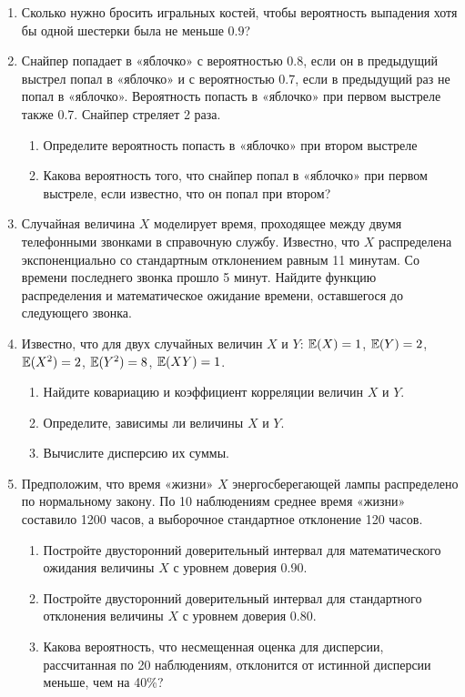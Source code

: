 \begin{enumerate}

\item Сколько нужно бросить игральных костей, чтобы вероятность выпадения хотя бы одной шестерки была не меньше $0.9$?
\item Снайпер попадает в «яблочко» с вероятностью 0.8, если он в предыдущий выстрел попал в «яблочко» и с вероятностью 0.7, если в предыдущий раз не попал в  «яблочко». Вероятность попасть в «яблочко» при первом выстреле также 0.7. Снайпер стреляет 2 раза.
\begin{enumerate}
\item Определите вероятность попасть в «яблочко» при втором выстреле
\item Какова вероятность того, что снайпер попал в «яблочко» при первом выстреле, если известно, что он попал при втором?
\end{enumerate}

\item Случайная величина $X$ моделирует время, проходящее между двумя телефонными звонками в справочную службу. Известно, что $X$ распределена экспоненциально со стандартным отклонением равным 11 минутам. Со времени последнего звонка прошло 5 минут. Найдите функцию распределения и математическое ожидание времени, оставшегося до следующего звонка.

\item Известно, что для двух случайных величин $X$ и $Y$: $\operatorname{\mathbb{E}}(X)=1$, $\operatorname{\mathbb{E}}(Y)=2$, $\operatorname{\mathbb{E}}(X^2)=2$, $\operatorname{\mathbb{E}}(Y^2)=8$, $\operatorname{\mathbb{E}}(XY)=1$.
\begin{enumerate}
\item Найдите ковариацию и коэффициент корреляции величин $X$ и $Y$.
\item Определите, зависимы ли величины $X$ и $Y$.
\item Вычислите дисперсию их суммы.
\end{enumerate}

\item Предположим, что время «жизни» $X$ энергосберегающей лампы распределено по нормальному закону. По 10 наблюдениям среднее время «жизни» составило 1200 часов, а выборочное стандартное отклонение 120 часов.
\begin{enumerate}
\item Постройте двусторонний доверительный интервал для математического ожидания величины $X$ с уровнем доверия 0.90.
\item Постройте двусторонний доверительный интервал для стандартного отклонения величины $X$ с уровнем доверия 0.80.
\item Какова вероятность, что несмещенная оценка для дисперсии, рассчитанная по 20 наблюдениям, отклонится от истинной дисперсии меньше, чем на 40\%?
\end{enumerate}


\end{enumerate}
